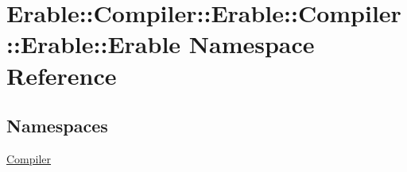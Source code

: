 \hypertarget{namespace_erable_1_1_compiler_1_1_erable_1_1_compiler_1_1_erable_1_1_erable}{}\section{Erable\+::Compiler\+::Erable\+::Compiler\+::Erable\+::Erable Namespace Reference}
\label{namespace_erable_1_1_compiler_1_1_erable_1_1_compiler_1_1_erable_1_1_erable}
\subsection*{Namespaces}
\begin{DoxyCompactItemize}
\item 
 \mbox{\hyperlink{namespace_erable_1_1_compiler_1_1_erable_1_1_compiler_1_1_erable_1_1_erable_1_1_compiler}{Compiler}}
\end{DoxyCompactItemize}
